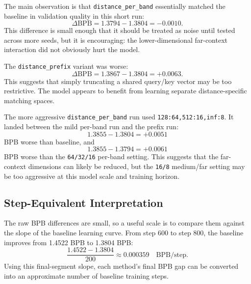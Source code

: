 \documentclass[11pt]{article}
\begin{document}
The main observation is that \texttt{distance\_per\_band} essentially matched the baseline in validation quality in this short run:
\begin{equation}
    \Delta \mathrm{BPB}
    =
    1.3794 - 1.3804
    =
    -0.0010.
\end{equation}
This difference is small enough that it should be treated as noise until tested across more seeds, but it is encouraging: the lower-dimensional far-context interaction did not obviously hurt the model.

The \texttt{distance\_prefix} variant was worse:
\begin{equation}
    \Delta \mathrm{BPB}
    =
    1.3867 - 1.3804
    =
    +0.0063.
\end{equation}
This suggests that simply truncating a shared query/key vector may be too restrictive. The model appears to benefit from learning separate distance-specific matching spaces.

The more aggressive \texttt{distance\_per\_band} run used \texttt{128:64,512:16,inf:8}. It landed between the mild per-band run and the prefix run:
\begin{equation}
    1.3855 - 1.3804 = +0.0051
\end{equation}
BPB worse than baseline, and
\begin{equation}
    1.3855 - 1.3794 = +0.0061
\end{equation}
BPB worse than the \texttt{64/32/16} per-band setting. This suggests that the far-context dimensions can likely be reduced, but the \texttt{16/8} medium/far setting may be too aggressive at this model scale and training horizon.

\subsection{Step-Equivalent Interpretation}

The raw BPB differences are small, so a useful scale is to compare them against the slope of the baseline learning curve. From step 600 to step 800, the baseline improves from 1.4522 BPB to 1.3804 BPB:
\begin{equation}
    \frac{1.4522 - 1.3804}{200}
    \approx
    0.000359
    \quad \mathrm{BPB/step}.
\end{equation}
Using this final-segment slope, each method's final BPB gap can be converted into an approximate number of baseline training steps.
\end{document}
